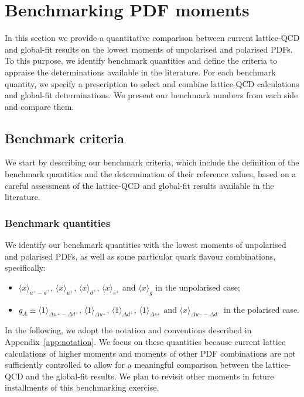 \section{Benchmarking PDF moments}
\label{sec:benchmarking}

In this section we provide a quantitative comparison between 
current lattice-QCD and global-fit results on the lowest
moments of unpolarised and polarised PDFs.
%
To this purpose, we identify benchmark quantities
and define the criteria to appraise the determinations
available in the literature.
%
For each benchmark quantity, we specify a prescription to 
select and combine lattice-QCD calculations and global-fit determinations.
%
We present our benchmark numbers from each side and compare them.

\subsection{Benchmark criteria}
\label{subsec:BC}

We start by describing our benchmark criteria, which include the definition
of the benchmark quantities and the determination of their reference values,
based on a careful assessment of the lattice-QCD and global-fit results 
available in the literature.

\subsubsection{Benchmark quantities}
\label{subsubsec:BQ}

We identify our benchmark quantities with the lowest moments of unpolarised 
and polarised PDFs, as well as  some particular quark
flavour combinations, specifically:
\begin{itemize}
  \item
$\langle x\rangle_{u^+-d^+}$, $\langle x \rangle_{u^+}$, $\langle x \rangle_{d^+}$, 
$\langle x \rangle_{s^+}$ and $\langle x \rangle_{g}$ in the unpolarised case; 
\item $g_A\equiv\langle 1 \rangle_{\Delta u^+ - \Delta d ^+}$, 
$\langle 1 \rangle_{\Delta u^+}$, $\langle 1 \rangle_{\Delta d^+}$,  
$\langle 1 \rangle_{\Delta s^+}$ and $\langle x \rangle_{\Delta u^- - \Delta d^-}$ 
  in the polarised case.
  \end{itemize}
%
In the following, we adopt the notation and conventions
described in Appendix~\ref{app:notation}.
%
We focus on these quantities because current lattice 
calculations of higher moments and moments of other PDF 
combinations are not sufficiently controlled to allow for a meaningful 
comparison between the lattice-QCD and the global-fit results. We plan to revisit
other moments in future installments of this benchmarking exercise.

